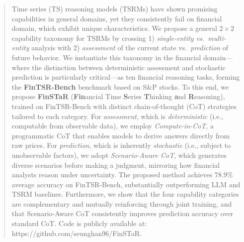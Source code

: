 \begin{abstract}
\vspace{-8pt}
Time series (TS) reasoning models (TSRMs) have shown promising capabilities in general domains, yet they consistently fail 
on financial domain, 
which exhibit unique characteristics. 
We propose a general $2 \times 2$ capability taxonomy for TSRMs by crossing 1) \textit{single-entity vs.\ multi-entity} analysis with 2) \textit{assessment} of the current state vs.\ \textit{prediction} of future behavior.
We instantiate this taxonomy in the financial domain---where the distinction between deterministic assessment and stochastic prediction is particularly critical---as ten financial reasoning tasks, forming the \textbf{FinTSR-Bench} benchmark based on S\&P stocks.
To this end, we propose \textbf{FinSTaR} (\textbf{Fin}ancial Time \textbf{S}eries \textbf{T}hinking \textbf{a}nd \textbf{R}easoning), 
trained on FinTSR-Bench with distinct chain-of-thought (CoT) strategies tailored to each category.
For \textit{assessment}, which is \textit{deterministic} (i.e., computable from observable data), we employ \textit{Compute-in-CoT}, a programmatic CoT that enables models to derive answers directly from raw prices. 
For \textit{prediction}, which is inherently \textit{stochastic} (i.e., subject to unobservable factors), we adopt \textit{Scenario-Aware CoT}, which generates diverse scenarios before making a judgment, mirroring how financial analysts reason under uncertainty.
The proposed method achieves 78.9\% average accuracy 
on FinTSR-Bench,
substantially outperforming 
LLM and TSRM baselines.
Furthermore, we show that 
the 
four capability categories are complementary and mutually reinforcing through joint training, and that Scenario-Aware CoT consistently improves prediction accuracy over standard CoT.
Code is publicly available at: https://github.com/seunghan96/FinSTaR.
\end{abstract}
\vspace{-10pt}
